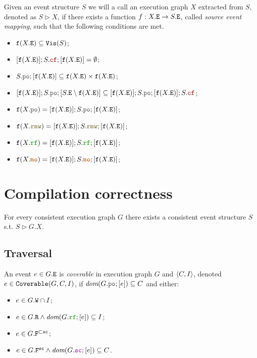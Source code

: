 \documentclass[12pt]{article}
\begin{document}
\begin{definition}
  Given an event structure $S$ we will a call an execution graph $X$
  extracted from $S$, denoted as $S \rhd X$,
  if there exists a function $f : X.{\mathtt{E}} \rightarrow S.{\mathtt{E}}$, called \emph{source event mapping},
  such that the following conditions are met.
  \begin{itemize}
    \item ${\mathtt{f}}(X.{\mathtt{E}}) \subseteq {\mathtt{Vis}}(S)$;
    \item $[\f(X.\lE)];S.\lCF;[\f(X.\lE)] = \emptyset$;
    \item $S.\lPO;[\f(X.\lE)] \subseteq \f(X.\lE) \times \f(X.\lE)$;
    \item $[\f(X.\lE)];S.\lPO;[S.\lE \setminus \f(X.\lE)] \subseteq
           [\f(X.\lE)];S.\lPO;[\f(X.\lE)];S.\lCF$;
    \item $\f(X.\lPO)  = [\f(X.\lE)];S.\lPO; [\f(X.\lE)]$;
    \item $\f(X.\lRMW) = [\f(X.\lE)];S.\lRMW;[\f(X.\lE)]$;
    \item $\f(X.\lRF)  = [\f(X.\lE)];S.\lRF; [\f(X.\lE)]$;
    \item $\f(X.\lMO)  = [\f(X.\lE)];S.\lMO; [\f(X.\lE)]$;
  \end{itemize}
\end{definition}

\section{Compilation correctness}

\begin{theorem}
  For every consistent \imm execution graph $G$
  there exists a consistent event structure $S$
  s.t. $S \rhd G.X$.
\end{theorem}

\subsection{Traversal}

\begin{definition}
  An event $e \in G.{\mathtt{E}}$ is \emph{coverable} in \imm execution graph $G$ and $\langle C, I \rangle$,
  denoted $e \in {\mathtt{Coverable}}(G, C, I)$, 
  if $\dom{G.\lPO;[e]} \subseteq C$ and either:
  \begin{itemize}
    \item $e \in G.{\mathtt{W}} \cap I$;
    \item $e \in G.\lR \wedge \dom{G.\lRF;[e]} \subseteq I$;
    \item $e \in G.{\mathtt{F}}^{\sqsubset{\mathtt{sc}}}$;
    \item $e \in G.\lF^{\sco} \wedge \dom{G.\lSC;[e]} \subseteq C$.
  \end{itemize}
\end{definition}
\end{document}

